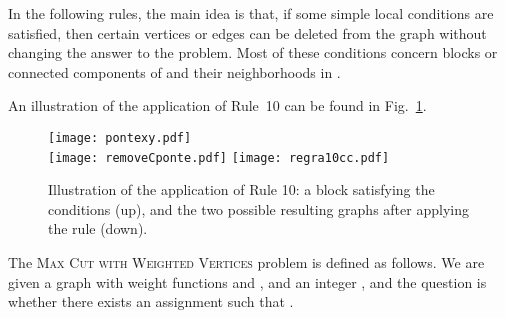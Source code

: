 \documentclass[
final
]{dmtcs-episciences}
\begin{document}
In the following rules, the main idea is that, if some simple local conditions are satisfied, then certain vertices or edges can be deleted from the graph without changing the answer to the problem. Most of these conditions concern blocks or connected components of  and their neighborhoods in .

\vspace{.3cm}


\vspace{.3cm}


\vspace{.3cm}
	

\vspace{.3cm}

An illustration of the application of Rule~10 can be found in Fig.~\ref{fig:Rule10}.

\begin{figure}[h!]
\begin{center} \texttt{[image: pontexy.pdf]}\\
\vspace{.4cm}
  \texttt{[image: removeCponte.pdf]}\hspace{1cm}
\texttt{[image: regra10cc.pdf]}
\caption{Illustration of the application of Rule 10: a block  satisfying the conditions (up), and the two possible resulting graphs after applying the rule (down).} \label{fig:Rule10} \end{center}
\end{figure}

\vspace{.3cm}
The \textsc{Max Cut with Weighted Vertices} problem is defined as follows. We are given a graph  with weight functions  and , and an integer , and the question is whether there exists an assignment  such that .
\vspace{.3cm}

	
\end{document}
